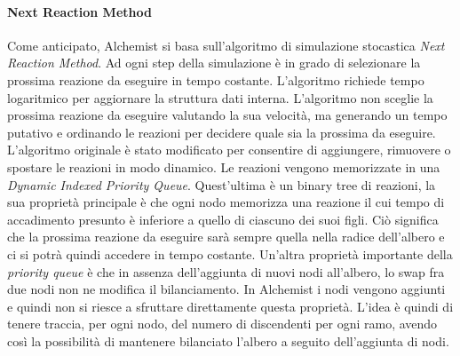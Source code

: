 \documentclass[12pt,a4paper,openright,twoside]{book}
\begin{document}
\paragraph{Next Reaction Method}
Come anticipato, Alchemist si basa sull'algoritmo di simulazione stocastica \textit{Next Reaction Method}. Ad ogni step della simulazione è in grado di selezionare la prossima reazione da eseguire in tempo costante. L'algoritmo richiede tempo logaritmico per aggiornare la struttura dati interna. L'algoritmo non sceglie la prossima reazione da eseguire valutando la sua velocità, ma generando un tempo putativo e ordinando le reazioni per decidere quale sia la prossima da eseguire. L'algoritmo originale è stato modificato per consentire di aggiungere, rimuovere o spostare le reazioni in modo dinamico. 
Le reazioni vengono memorizzate in una \textit{Dynamic Indexed Priority Queue}. Quest'ultima è un binary tree di reazioni, la sua proprietà principale è che ogni nodo memorizza una reazione il cui tempo di accadimento presunto è inferiore a quello di ciascuno dei suoi figli. Ciò significa che la prossima reazione da eseguire sarà sempre quella nella radice dell'albero e ci si potrà quindi accedere in tempo costante. 
Un'altra proprietà importante della \textit{priority queue} è che in assenza dell'aggiunta di nuovi nodi all'albero, lo swap fra due nodi non ne modifica il bilanciamento. 
In Alchemist i nodi vengono aggiunti e quindi non si riesce a sfruttare direttamente questa proprietà. L'idea è quindi di tenere traccia, per ogni nodo, del numero di discendenti per ogni ramo, avendo così la possibilità di mantenere bilanciato l'albero a seguito dell'aggiunta di nodi. 
\end{document}

